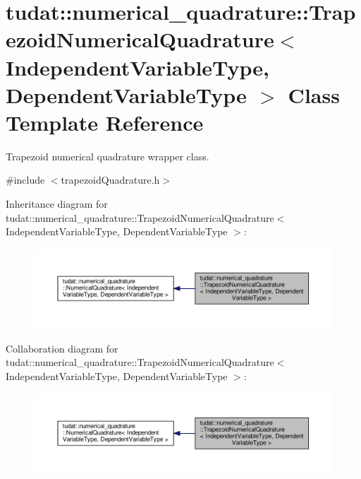\hypertarget{classtudat_1_1numerical__quadrature_1_1TrapezoidNumericalQuadrature}{}\section{tudat\+:\+:numerical\+\_\+quadrature\+:\+:Trapezoid\+Numerical\+Quadrature$<$ Independent\+Variable\+Type, Dependent\+Variable\+Type $>$ Class Template Reference}
\label{classtudat_1_1numerical__quadrature_1_1TrapezoidNumericalQuadrature}


Trapezoid numerical quadrature wrapper class.  




{\ttfamily \#include $<$trapezoid\+Quadrature.\+h$>$}



Inheritance diagram for tudat\+:\+:numerical\+\_\+quadrature\+:\+:Trapezoid\+Numerical\+Quadrature$<$ Independent\+Variable\+Type, Dependent\+Variable\+Type $>$\+:
\nopagebreak
\begin{figure}[H]
\begin{center}
\leavevmode
\includegraphics[width=350pt]{classtudat_1_1numerical__quadrature_1_1TrapezoidNumericalQuadrature__inherit__graph}
\end{center}
\end{figure}


Collaboration diagram for tudat\+:\+:numerical\+\_\+quadrature\+:\+:Trapezoid\+Numerical\+Quadrature$<$ Independent\+Variable\+Type, Dependent\+Variable\+Type $>$\+:
\nopagebreak
\begin{figure}[H]
\begin{center}
\leavevmode
\includegraphics[width=350pt]{classtudat_1_1numerical__quadrature_1_1TrapezoidNumericalQuadrature__coll__graph}
\end{center}
\end{figure}

